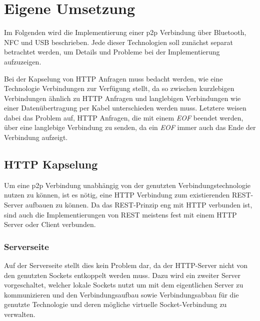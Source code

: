 \section{Eigene Umsetzung}
        Im Folgenden wird die Implementierung einer p2p Verbindung über Bluetooth, NFC und USB beschrieben. Jede dieser Technologien soll zunächst separat betrachtet werden, um Details und Probleme bei der Implementierung aufzuzeigen.
        
        Bei der Kapselung von HTTP Anfragen muss bedacht werden, wie eine Technologie Verbindungen zur Verfügung stellt, da so zwischen kurzlebigen Verbindungen ähnlich zu HTTP Anfragen und langlebigen Verbindungen wie einer Datenübertragung per Kabel unterschieden werden muss. Letztere weisen dabei das Problem auf, HTTP Anfragen, die mit einem {\it EOF} beendet werden, über eine langlebige Verbindung zu senden, da ein {\it EOF} immer auch das Ende der Verbindung aufzeigt.
        
    \subsection{HTTP Kapselung}
        Um eine p2p Verbindung unabhängig von der genutzten Verbindungstechnologie nutzen zu können, ist es nötig, eine HTTP Verbindung zum existierenden REST-Server aufbauen zu können. Da das REST-Prinzip eng mit HTTP verbunden ist, sind auch die Implementierungen von REST meistens fest mit einem HTTP Server oder Client verbunden.
    \subsubsection{Serverseite}        
        Auf der Serverseite stellt dies kein Problem dar, da der HTTP-Server nicht von den genutzten Sockets entkoppelt werden muss. Dazu wird ein zweiter Server vorgeschaltet, welcher lokale Sockets nutzt um mit dem eigentlichen Server zu kommunizieren und den Verbindungsaufbau sowie Verbindungsabbau für die genutzte Technologie und deren mögliche virtuelle Socket-Verbindung zu verwalten.
        
